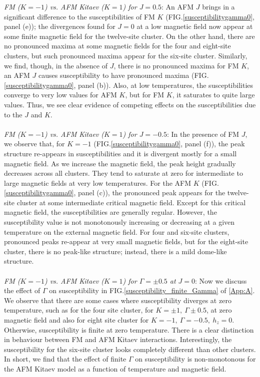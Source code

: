 \documentclass[aps,amsmath,twocolumn,amssymb,floatfix,showpacs,superscriptaddress,nofootinbib,longbibliography]{revtex4-1}
\begin{document}
{\it \small{FM ($K=-1$) vs. AFM Kitaev ($K=1$) for $J=0.5$}}: An AFM $J$ brings in a significant difference to the susceptibilities of FM $K$ (FIG.\ref{susceptibilitygamma0}, panel (e)); the divergences found for $J=0$ at a low magnetic field now appear at some finite magnetic field for the twelve-site cluster. On the other hand, there are no pronounced maxima at some magnetic fields for the four and eight-site clusters, but such pronounced maxima appear for the six-site cluster. Similarly, we find, though, in the absence of $J$, there is no pronounced maxima for FM $K$, an AFM $J$ causes susceptibility to have pronounced maxima (FIG.\ref{susceptibilitygamma0}, panel (b)). Also, at low temperatures, the susceptibilities converge to very low values for AFM $K$, but for FM $K$, it saturates to quite large values. Thus, we see clear evidence of competing effects on the susceptibilities due to the $J$ and $K$.
\\\\\indent
{\it \small{FM ($K=-1$) vs. AFM Kitaev ($K=1$) for $J=-0.5$}}: In the presence of FM $J$, we observe that, for $K=-1$ (FIG.\ref{susceptibilitygamma0}, panel (f)), the peak structure re-appears in susceptibilities and it is divergent mostly for a small magnetic field. As we increase the magnetic field, the peak height gradually decreases across all clusters. They tend to saturate at zero for intermediate to large magnetic fields at very low temperatures. For the AFM $K$ (FIG.\ref{susceptibilitygamma0}, panel (c)), the pronounced peak appears for the twelve-site cluster at some intermediate critical magnetic field. Except for this critical magnetic field, the susceptibilities are generally regular. However, the susceptibility value is not monotonously increasing or decreasing at a given temperature on the external magnetic field. For four and six-site clusters, pronounced peaks re-appear at very small magnetic fields, but for the eight-site cluster, there is no peak-like structure; instead, there is a mild dome-like structure.
\\\\\indent
{\it \small{FM ($K=-1$) vs. AFM Kitaev ($K=1$) for $\Gamma=\pm0.5$ at $J=0$}}: Now we discuss the effect of $\Gamma$ on susceptibility in FIG.\ref{susceptibility_finite_Gamma} of \ref{App:A}. We observe that there are some cases where susceptibility diverges at zero temperature, such as for the four site cluster, for $K=\pm1,~\Gamma\pm0.5$, at zero magnetic field and also for eight site cluster for $K=-1,~\Gamma=-0.5,~h_z=0$. Otherwise, susceptibility is finite at zero temperature. There is a clear distinction in behaviour between FM and AFM Kitaev interactions. Interestingly, the susceptibility for the six-site cluster looks completely different than other clusters. In short, we find that the effect of finite $\Gamma$ on susceptibility is non-monotonous for the AFM Kitaev model as a function of temperature and magnetic field.
\end{document}
